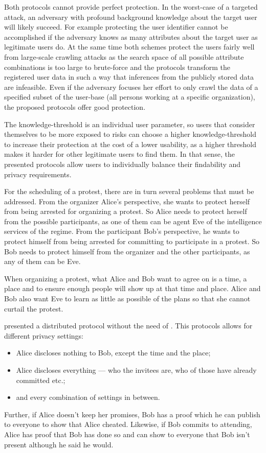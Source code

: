 Both protocols cannot provide perfect protection. In the worst-case of a
targeted attack, an adversary with profound background knowledge about
the target user will likely succeed. For example protecting the user
identifier cannot be accomplished if the adversary knows as many
attributes about the target user as legitimate users do.
At the same time both schemes protect the users fairly well from
large-scale crawling attacks as the search space of all possible
attribute combinations is too large to brute-force and the protocols
transform the registered user data in such a way that inferences from
the publicly stored data are infeasible. Even if the adversary focuses
her effort to only crawl the data of a specified subset of the user-base
(\eg all persons working at a specific organization), the proposed
protocols offer good protection. 

The knowledge-threshold is an individual user parameter, so users that
consider themselves to be more exposed to risks can choose a higher
knowledge-threshold to increase their protection at the cost of a lower
usability, as a higher threshold makes it harder for other legitimate
users to find them. In that sense, the presented protocols allow users
to individually balance their findability and privacy requirements.


For the scheduling of a protest, there are in turn several problems that must 
be addressed.
From the organizer Alice's perspective, she wants to protect herself from being 
arrested for organizing a protest.
So Alice needs to protect herself from the possible participants, as one of 
them can be agent Eve of the intelligence services of the regime.
From the participant Bob's perspective, he wants to protect himself from being 
arrested for committing to participate in a protest.
So Bob needs to protect himself from the organizer and the other participants, 
as any of them can be Eve.

When organizing a protest, what Alice and Bob want to agree on is a time, 
a place and to ensure enough people will show up at that time and place.
Alice and Bob also want Eve to learn as little as possible of the plans so 
that she cannot curtail the protest.

\citet{EventsInvitations} presented a distributed protocol without the need of 
.
This protocols allows for different privacy settings:
\begin{itemize}
\item Alice discloses nothing to Bob, except the time and the place;
\item Alice discloses everything --- who the invitees are, who of those have 
  already committed etc.;
\item and every combination of settings in between.
\end{itemize}
Further, if Alice doesn't keep her promises, Bob has a proof which he can 
publish to everyone to show that Alice cheated.
Likewise, if Bob commits to attending, Alice has proof that Bob has done so and 
can show to everyone that Bob isn't present although he said he would.

